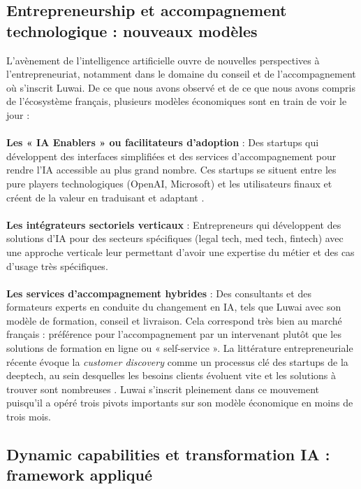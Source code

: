 \subsection{Entrepreneurship et accompagnement technologique : nouveaux modèles}

L’avènement de l’intelligence artificielle ouvre de nouvelles perspectives à l’entrepreneuriat, notamment dans le domaine du conseil et de l’accompagnement où s’inscrit Luwai. De ce que nous avons observé et de ce que nous avons compris de l’écosystème français, plusieurs modèles économiques sont en train de voir le jour :
\\\\
\textbf{Les « IA Enablers » ou facilitateurs d'adoption} : Des startups qui développent des interfaces simplifiées et des services d'accompagnement pour rendre l'IA accessible au plus grand nombre. Ces startups se situent entre les pure players technologiques (OpenAI, Microsoft) et les utilisateurs finaux et créent de la valeur en traduisant et adaptant \cite{parker2016platform}.
\\\\
\textbf{Les intégrateurs sectoriels verticaux} : Entrepreneurs qui développent des solutions d'IA pour des secteurs spécifiques (legal tech, med tech, fintech) avec une approche verticale leur permettant d'avoir une expertise du métier et des cas d'usage très spécifiques.
\\\\
\textbf{Les services d'accompagnement hybrides} : Des consultants et des formateurs experts en conduite du changement en IA, tels que Luwai avec son modèle de formation, conseil et livraison. Cela correspond très bien au marché français : préférence pour l'accompagnement par un intervenant plutôt que les solutions de formation en ligne ou « self-service ».
La littérature entrepreneuriale récente évoque la \textit{customer discovery} comme un processus clé des startups de la deeptech, au sein desquelles les besoins clients évoluent vite et les solutions à trouver sont nombreuses \cite{blank2013lean, osterwalder2014value}. Luwai s’inscrit pleinement dans ce mouvement puisqu’il a opéré trois pivots importants sur son modèle économique en moins de trois mois.

\subsection{Dynamic capabilities et transformation IA : framework appliqué}

